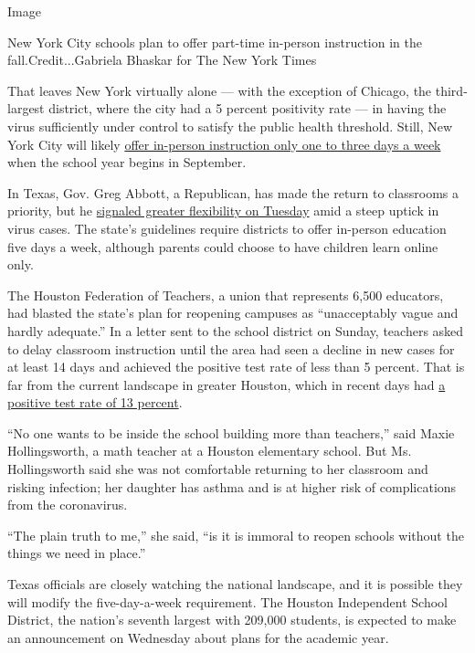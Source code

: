 Image

New York City schools plan to offer part-time in-person instruction in
the fall.Credit...Gabriela Bhaskar for The New York Times

That leaves New York virtually alone --- with the exception of Chicago,
the third-largest district, where the city had a 5 percent positivity
rate --- in having the virus sufficiently under control to satisfy the
public health threshold. Still, New York City will likely
\href{https://www.nytimes.com/2020/07/08/nyregion/nyc-schools-reopening-plan.html}{offer
in-person instruction only one to three days a week} when the school
year begins in September.

In Texas, Gov. Greg Abbott, a Republican, has made the return to
classrooms a priority, but he
\href{https://www.texastribune.org/2020/07/14/texas-schools-online-pandemic/}{signaled
greater flexibility on Tuesday} amid a steep uptick in virus cases. The
state's guidelines require districts to offer in-person education five
days a week, although parents could choose to have children learn online
only.

The Houston Federation of Teachers, a union that represents 6,500
educators, had blasted the state's plan for reopening campuses as
``unacceptably vague and hardly adequate.'' In a letter sent to the
school district on Sunday, teachers asked to delay classroom instruction
until the area had seen a decline in new cases for at least 14 days and
achieved the positive test rate of less than 5 percent. That is far from
the current landscape in greater Houston, which in recent days had
\href{https://www.tmc.edu/coronavirus-updates/covid-19-testing-trends/}{a
positive test rate of 13 percent}.

``No one wants to be inside the school building more than teachers,''
said Maxie Hollingsworth, a math teacher at a Houston elementary school.
But Ms. Hollingsworth said she was not comfortable returning to her
classroom and risking infection; her daughter has asthma and is at
higher risk of complications from the coronavirus.

``The plain truth to me,'' she said, ``is it is immoral to reopen
schools without the things we need in place.''

Texas officials are closely watching the national landscape, and it is
possible they will modify the five-day-a-week requirement. The Houston
Independent School District, the nation's seventh largest with 209,000
students, is expected to make an announcement on Wednesday about plans
for the academic year.

